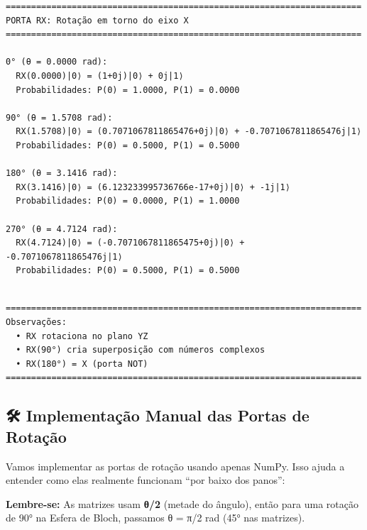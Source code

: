 \documentclass[
  brazilian,
]{report}
\begin{document}
\begin{verbatim}
======================================================================
PORTA RX: Rotação em torno do eixo X
======================================================================

0° (θ = 0.0000 rad):
  RX(0.0000)|0⟩ = (1+0j)|0⟩ + 0j|1⟩
  Probabilidades: P(0) = 1.0000, P(1) = 0.0000

90° (θ = 1.5708 rad):
  RX(1.5708)|0⟩ = (0.7071067811865476+0j)|0⟩ + -0.7071067811865476j|1⟩
  Probabilidades: P(0) = 0.5000, P(1) = 0.5000

180° (θ = 3.1416 rad):
  RX(3.1416)|0⟩ = (6.123233995736766e-17+0j)|0⟩ + -1j|1⟩
  Probabilidades: P(0) = 0.0000, P(1) = 1.0000

270° (θ = 4.7124 rad):
  RX(4.7124)|0⟩ = (-0.7071067811865475+0j)|0⟩ + -0.7071067811865476j|1⟩
  Probabilidades: P(0) = 0.5000, P(1) = 0.5000
\end{verbatim}

\begin{verbatim}

======================================================================
Observações:
  • RX rotaciona no plano YZ
  • RX(90°) cria superposição com números complexos
  • RX(180°) = X (porta NOT)
======================================================================
\end{verbatim}

\subsection{🛠️ Implementação Manual das Portas de
Rotação}\label{implementauxe7uxe3o-manual-das-portas-de-rotauxe7uxe3o}

Vamos implementar as portas de rotação usando apenas NumPy. Isso ajuda a
entender como elas realmente funcionam ``por baixo dos panos'':

\textbf{Lembre-se:} As matrizes usam \textbf{θ/2} (metade do ângulo),
então para uma rotação de 90° na Esfera de Bloch, passamos θ = π/2 rad
(45° nas matrizes).
\end{document}
